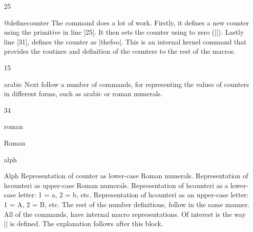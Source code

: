 \begin{teXXX}
25 \def\@definecounter#1{\expandafter\newcount\csname c@#1\endcsname
26   \setcounter{#1}\z@
27   \global\expandafter\let\csname cl@#1\endcsname\@empty
28   \@addtoreset{#1}{@ckpt}%
29   \global\expandafter\let\csname p@#1\endcsname\@empty
30   \expandafter
31   \gdef\csname the#1\expandafter\endcsname\expandafter
32       {\expandafter\@arabic\csname c@#1\endcsname}
}
\end{teXXX}

\begin{docCommand}{@definecounter}{}
The command does a lot of work. Firstly, it defines a new counter using the \tex primitive  in line [25]. It then sets the counter using  to zero (|\z@|). Lastly line [31], defines the counter as |thefoo|. This is an internal kernel command that provides the routines and definition of the counters to the rest of the macros.
\end{docCommand}

\begin{teXXX}
15 \def\@newctr#1[#2]{%
16   \@ifundefined{c@#2}{\@nocounterr{#2}}{\@addtoreset{#1}{#2}}}
\end{teXXX}




\begin{docCommand}{arabic} {}
Next follow a number of commands, for representing the values of counters in different forms, such
as arabic or roman numerals.
\end{docCommand}

\begin{teXXX}
34 \def\arabic#1{\expandafter\@arabic\csname c@#1\endcsname}
\end{teXXX}

\begin{docCommand}{roman} {}
\end{docCommand}
\begin{docCommand}{Roman}{}
\begin{docCommand}{alph}{}
\begin{docCommand}{Alph}{}
Representation of counter as lower-case Roman numerals.  Representation of hcounteri as upper-case Roman numerals.  Representation of hcounteri as a lower-case letter: 1 = a, 2 = b, etc.  Representation of hcounteri as an upper-case letter: 1 = A, 2 = B, etc.
The rest of the number definitions, follow in the same manner.  All of the commands, have internal macro representations. Of interest is the way |\Roman| is defined. The explanation follows after this block.

\end{docCommand}
\end{docCommand}
\end{docCommand}

